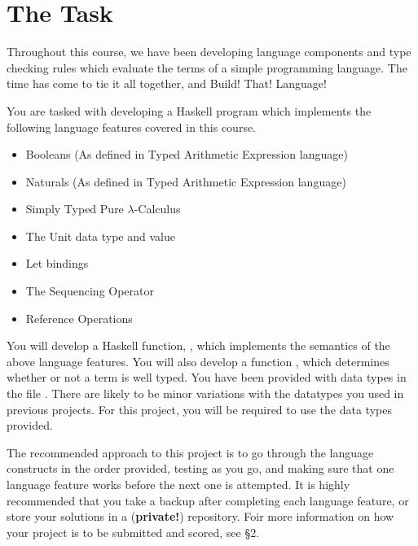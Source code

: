 \documentclass{exam}
\let\OldTexttt\texttt
\renewcommand{\texttt}[1]{\OldTexttt{\color{teal}{#1}}}
\begin{document}
\begin{center}
\end{center}

\section{The Task}

Throughout this course, we have been developing language components and type checking rules which evaluate the terms of a simple programming language.  The time has come to tie it all together, and Build! That! Language! 

You are tasked with developing a Haskell program which implements the following language features covered in this course. 
\begin{itemize}
\item Booleans (As defined in Typed Arithmetic Expression language)
\item Naturals (As defined in Typed Arithmetic Expression language)
\item Simply Typed Pure $\lambda$-Calculus 
\item The Unit data type and value
\item Let bindings
\item The Sequencing Operator
\item Reference Operations
\end{itemize}

You will develop a Haskell function, \texttt{ssos}, which implements the semantics of the above language features.  You will also develop a function \texttt{typeCheck}, which determines whether or not a term is well typed.  You have been provided with data types in the file \texttt{template.hs}.  There are likely to be minor variations with the datatypes you used in previous projects.  For this project, you will be required to use the data types provided.  

The recommended approach to this project is to go through the language constructs in the order provided, testing as you go, and making sure that one language feature works before the next one is attempted.  It is highly recommended that you take a backup after completing each language feature, or store your solutions in a (\textbf{private!}) repository.  Foir more information on how your project is to be submitted and scored, see \S 2.
\end{document}
